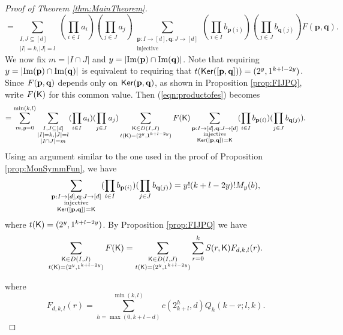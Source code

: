 \documentclass[11pt, a4paper, oneside, reqno]{amsart}
\newcommand{\sK}{{\sf K}}
\newcommand{\copairpq}{{[{\bf p},{\bf q}]}}
\newcommand{\setK}{{D(I,J)}}
\theoremstyle{remark}
\theoremstyle{definition}
\numberwithin{equation}{section}
\begin{document}
\begin{proof}[Proof of Theorem \ref{thm:MainTheorem}]
\begin{equation}\label{eqn:productofes}
	= \sum_{\substack{I,J \subseteq [d]\\ |I| = k, |J| = l }} (\prod_{i\in I}a_{i})(\prod_{j\in J}a_{j})\sum_{\substack{\mathbf{p}: I \to [d], \mathbf{q}: J \to [d]\\ \text{injective} }} (\prod_{i \in I}b_{\mathbf{p}(i)})(\prod_{j \in J}b_{\mathbf{q}(j)}) F(\mathbf{p}, \mathbf{q}).
\end{equation}
We now fix $m = |I \cap J|$ and $y = |{\rm Im}({\bf p}) \cap {\rm Im}({\bf q})|$. Note that requiring  $y = |{\rm Im}({\bf p}) \cap {\rm Im}({\bf q})|$ is equivalent to requiring that $t({\sf Ker}(\copairpq)) = (2^y,1^{k+l-2y})$. Since $F({\bf p}, {\bf q})$ depends only on ${\sf Ker}({\bf p}, {\bf q})$, as shown in Proposition \ref{prop:FIJPQ}, write $F({\sf K})$ for this common value. Then (\ref{eqn:productofes}) becomes
\begin{equation}\label{eqn:productofes2}
	= \sum_{m,y=0}^{\text{min}(k,l)}\sum_{\substack{I,J \subseteq [d]\\ |I| = k, |J| = l \\ |I \cap J| =m}}  (\prod_{i\in I}a_{i})(\prod_{j\in J}a_{j})
	\sum_{\substack {{\sK}\in \setK \\ t({\sK}) = (2^y,1^{k+l-2y})}} F({\sK})\sum_{\substack{\mathbf{p}: I \to [d], \mathbf{q}: J \to [d]\\ \text{injective} \\ {\sf Ker}(\copairpq)={\sK}}}  (\prod_{i \in I}b_{\mathbf{p}(i)})(\prod_{j \in J}b_{\mathbf{q}(j)}) .
\end{equation}
Using an argument similar to the one used in the proof of Proposition \ref{prop:MonSymmFun},
we have
$$
	\sum_{\substack{\mathbf{p}: I \to [d], \mathbf{q}: J \to [d]\\ \text{injective} \\ {\sf Ker}(\copairpq)={\sK}}}  (\prod_{i \in I}b_{\mathbf{p}(i)})(\prod_{j \in J}b_{\mathbf{q}(j)}) = {y!(k+l-2y)!}M_y(b),
$$
where $t({\sf K}) = (2^y,1^{k+l-2y})$.
By Proposition \ref{prop:FIJPQ} we have
\begin{equation}
\label{eqn:Fdkl}
	\sum_{\substack {{\sf K}\in D(I,J) \\ t({\sf K}) = (2^y,1^{k+l-2y})}} F({\sf K}) = \sum_{\substack {{\sf K}\in D(I,J) \\ t({\sf K}) = (2^y,1^{k+l-2y})}} \sum_{r = 0}^k S(r,{\sf K}) F_{d,k,l}(r).
\end{equation}

where
$$
	F_{d,k,l}(r)= \sum_{h=\max(0,k+l-d)}^{\min(k,l)} c(2^h_{k+l},d) Q_h(k-r; l,k).
$$


\end{proof}
\end{document}
